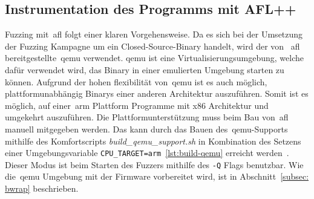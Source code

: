 \subsection{Instrumentation des Programms mit AFL++}\label{subsec: binary-only-instrumentation}
Fuzzing mit~\gls{afl} folgt einer klaren Vorgehensweise.
Da es sich bei der Umsetzung der Fuzzing Kampagne um ein Closed-Source-Binary handelt, wird der von ~\gls{afl}
bereitgestellte~\gls{qemu} verwendet.
\gls{qemu} ist eine Virtualisierungsumgebung, welche dafür verwendet wird, das Binary in einer emulierten
Umgebung starten zu können.
Aufgrund der hohen flexibilität von~\gls{qemu} ist es auch möglich, plattformunabhängig Binarys einer anderen Architektur auszuführen.
Somit ist es möglich, auf einer~\gls{arm} Plattform Programme mit x86 Architektur und umgekehrt auszuführen.
Die Plattformunterstützung muss beim Bau von~\gls{afl} manuell mitgegeben werden.
Das kann durch das Bauen des~\gls{qemu}-Supports mithilfe des Komfortscripts \textit{build\_qemu\_support.sh} in Kombination des
Setzens einer Umgebungsvariable \texttt{CPU\_TARGET=arm}~\ref{lst:build-qemu} erreicht werden~\cite{afl-build-qemu}. \\
Dieser Modus ist beim Starten des Fuzzers mithilfe des \texttt{-Q} Flags benutzbar.
Wie die~\gls{qemu} Umgebung mit der Firmware vorbereitet wird, ist in Abschnitt~\ref{subsec: bwrap} beschrieben.
